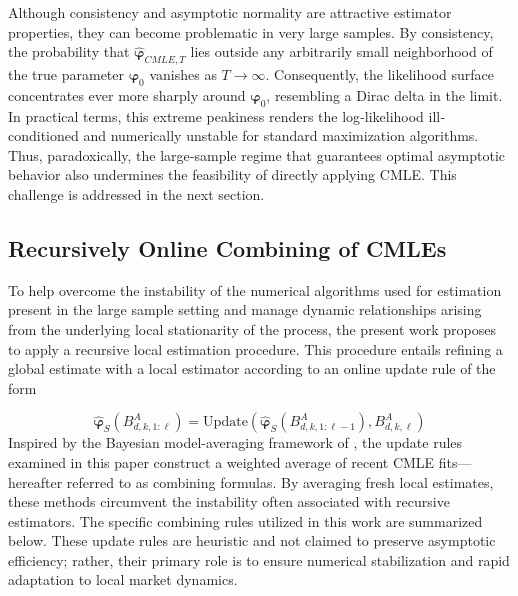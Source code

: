 \documentclass[10pt,a4paper,oneside]{article}
\begin{document}
Although consistency and asymptotic normality are attractive estimator properties, they can become problematic in very large samples.  By consistency, the probability that \(\hat{\boldsymbol{\varphi}}_{CMLE,T}\) lies outside any arbitrarily small neighborhood of the true parameter \(\boldsymbol{\varphi}_0\) vanishes as \(T\to\infty\).  Consequently, the likelihood surface concentrates ever more sharply around \(\boldsymbol{\varphi}_0\), resembling a Dirac delta in the limit.  In practical terms, this extreme peakiness renders the log‐likelihood ill‐conditioned and numerically unstable for standard maximization algorithms.  Thus, paradoxically, the large‐sample regime that guarantees optimal asymptotic behavior also undermines the feasibility of directly applying CMLE. This challenge is addressed in the next section.


\subsection{Recursively Online Combining of CMLEs}
\label{subsec:combining_cmles}

To help overcome the instability of the numerical algorithms used for estimation present in the large sample setting and manage dynamic relationships arising from the underlying local stationarity of the process, the present work proposes to apply a recursive local estimation procedure. This procedure entails refining a global estimate with a local estimator according to an online update rule of the form

$$
    \hat{\boldsymbol{\varphi}}_S\left( B^A_{d,k,1:\ell} \right) = \mathrm{Update}\left( \hat{\boldsymbol{\varphi}}_S\left( B^A_{d,k,1:\ell - 1} \right),  B^A_{d,k,\ell} \right)
$$
Inspired by the Bayesian model-averaging framework of \cite{madigan2003bayesian}, the update rules examined in this paper construct a weighted average of recent CMLE fits—hereafter referred to as combining formulas. By averaging fresh local estimates, these methods circumvent the instability often associated with recursive estimators. The specific combining rules utilized in this work are summarized below. These update rules are heuristic and not claimed to preserve asymptotic efficiency; rather, their primary role is to ensure numerical stabilization and rapid adaptation to local market dynamics.

\end{document}
